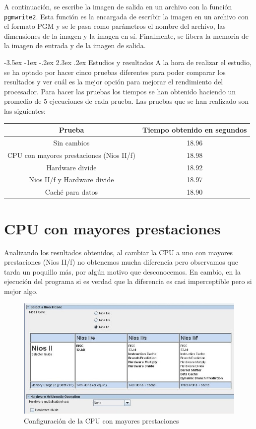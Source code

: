 \documentclass[11pt]{report}
\makeatletter
\renewcommand\chapter{\@startsection{chapter}{0}{\z@}%
    {-3.5ex \@plus -1ex \@minus -.2ex}%
    {2.3ex \@plus.2ex}%
    {\normalfont\Large\bfseries}}
\makeatother
\begin{document}
A continuación, se escribe la imagen de salida en un archivo con la función \texttt{pgmwrite2}. Esta función es la encargada de escribir la imagen
en un archivo con el formato PGM y se le pasa como parámetros el nombre del archivo, las dimensiones de la imagen y la imagen en sí. Finalmente,
se libera la memoria de la imagen de entrada y de la imagen de salida.

\newpage

\chapter{Estudios y resultados}
A la hora de realizar el estudio, se ha optado por hacer cinco pruebas diferentes para poder comparar los resultados y ver cuál es la mejor
opción para mejorar el rendimiento del procesador. Para hacer las pruebas los tiempos se han obtenido haciendo un promedio de 5 ejecuciones
de cada prueba. Las pruebas que se han realizado son las siguientes:

\begin{table}[H]
  \centering
  \begin{tabular}{|c|c|}
    \hline
    \textbf{Prueba} & \textbf{Tiempo obtenido en segundos} \\ \hline
    Sin cambios & 18.96 \\ \hline
    CPU con mayores prestaciones (Nios II/f) & 18.98 \\ \hline
    Hardware divide & 18.92 \\ \hline
    Nios II/f y Hardware divide & 18.97 \\ \hline
    Caché para datos & 18.90 \\ \hline
  \end{tabular}
\end{table}

\section{CPU con mayores prestaciones}
Analizando los resultados obtenidos, al cambiar la CPU a uno con mayores prestaciones (Nios II/f) no obtenemos mucha diferencia pero observamos
que tarda un poquillo más, por algún motivo que desconocemos. En cambio, en la ejecución del programa si es verdad que la diferencia es casi 
imperceptible pero si mejor algo.

\begin{figure}[H]
  \centering
  \includegraphics[scale=0.8]{img/cpu_mayores_prestaciones.jpeg}
  \caption{Configuración de la CPU con mayores prestaciones}
\end{figure}
\end{document}
